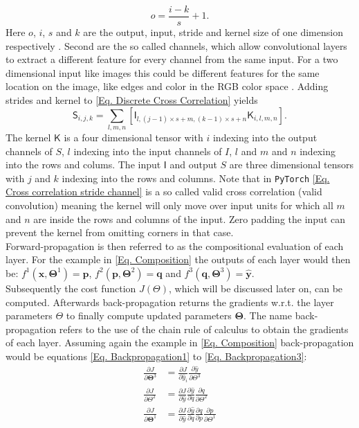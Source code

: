 \documentclass[12pt, a4paper]{article}
\begin{document}
\begin{equation}
	o = \frac{i -k}{s} + 1.
\end{equation} 
Here \(o\), \(i\), \(s\) and \(k\) are the output, input, stride and kernel size of one dimension respectively \cite{dumoulin2018guide}. Second are the so called channels, which allow convolutional layers to extract a different feature for every channel from the same input. For a two dimensional input like images this could be different features for the same location on the image, like edges and color in the RGB color space \cite{Goodfellow}. Adding strides and kernel to \cref{Eq. Discrete Cross Correlation} yields
\begin{equation}
	\mathsf{S}_{i,j,k} = \sum_{l,m,n}\left[\mathsf{I}_{l,(j-1)\times s+m,(k -1)\times s+n}\mathsf{K}_{i,l,m,n}\right]. \label{Eq. Cross correlation stride channel}
\end{equation}
The kernel \(\mathsf{K}\) is a four dimensional tensor with \(i\) indexing into the output channels of \(S\), \(l\) indexing into the input channels of \(I\), \(l\) and \(m\) and \(n\) indexing into the rows and colums. The input \(\mathsf{I}\) and output \(S\) are three dimensional tensors with \(j\) and \(k\) indexing into the rows and columns. Note that in \texttt{PyTorch} \cref{Eq. Cross correlation stride channel} is a so called valid cross correlation (valid convolution) \cite{bibid} meaning the kernel will only move over input units for which  all \(m\) and \(n\) are inside the rows and columns of the input. Zero padding the input can prevent the kernel from omitting corners in that case.
\\
\noindent
Forward-propagation is then referred to as the compositional evaluation of each layer. For the example in \cref{Eq. Composition} the outputs of each layer would then be:  \(f^1(\mathbf{x},\mathbf{\Theta}^1) = \mathbf{p}\), \(f^2(\mathbf{p},\mathbf{\Theta}^2) = \mathbf{q}\) and \(f^3(\mathbf{q},\mathbf{\Theta}^3) = \mathbf{\hat{y}}\).\\
Subsequently the cost function \(J(\Theta)\), which will be discussed later on, can be computed. Afterwards back-propagation returns the gradients w.r.t. the layer parameters \(\Theta\) to finally compute updated parameters \(\mathbf{\Theta}\).  The name back-propagation refers to the use of the chain rule of calculus to obtain the gradients of each layer. Assuming again the example in \cref{Eq. Composition} back-propagation would be equations \cref{Eq. Backpropagation1} to \cref{Eq. Backpropagation3}:
\begin{align}
	\frac{\partial J}{\partial \mathbf{\Theta}^3} &= \frac{\partial J}{\partial\hat{y}_i}\frac{\partial\hat{y}}{\partial \Theta^3}
\label{Eq. Backpropagation3}\\
	\frac{\partial J}{\partial \Theta^2} &= \frac{\partial J}{\partial\hat{y}}\frac{\partial\hat{y}}{\partial q}\frac{\partial q}{\partial \Theta^2}
\label{Eq. Backpropagation2}\\
	\frac{\partial J}{\partial \mathbf{\Theta}^1} &= \frac{\partial J}{\partial\hat{y}}\frac{\partial\hat{y}}{\partial q}\frac{\partial q}{\partial p}\frac{\partial p}{\partial \Theta^1}
\label{Eq. Backpropagation1}
\end{align}
\end{document}
